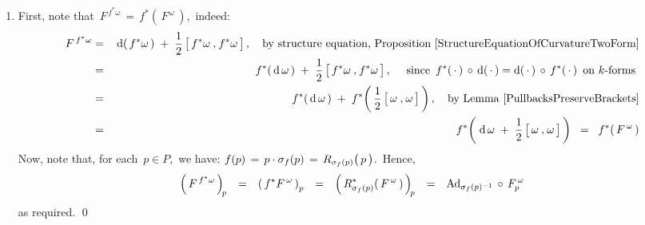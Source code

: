 \begin{enumerate}
\begin{eqnarray*}
	\end{eqnarray*}
	where the last two equalities follow from the hypothesis that \,$\omega$\,
	is a connection $1$-form, as well as from the following commutative diagram:
	\begin{center}
	\end{center}
	We may now conclude that
	\begin{equation*}
	f^{*}\omega
	\;\; = \;\;
		\Ad_{\sigma_{f}^{-1}} \,\circ\, \omega
		\; + \;
		\sigma_{f}^{*}(\,\mu_{G}\,)\,,
	\end{equation*}
	which completes the proof of (iii) as well as that of the present Proposition.
\item
	First, note that
	\,$F^{\,f^{*}\omega} \,=\, f^{*}\!\left(\,F^{\,\omega}\,\right)$,\, indeed:
	\begin{eqnarray*}
	F^{\,f^{*}\omega}
	& = &
		\,\d(\,\overset{{\color{white}.}}{f^{*}\omega}\,)
		\; + \;
		\dfrac{1}{2}\left[\,f^{*}\omega\,\overset{{\color{white}1}}{,}\,f^{*}\omega\,\right],
		\quad
		\textnormal{by structure equation, Proposition \ref{StructureEquationOfCurvatureTwoForm}}
	\\
	& = &
		f^{*}(\,\d\,\omega\,)
		\; + \;
		\dfrac{1}{2}\left[\,f^{*}\omega\,\overset{{\color{white}1}}{,}\,f^{*}\omega\,\right],
		\quad
		\textnormal{
			since \,$f^{*}(\,\cdot\,) \,\circ\, \d(\,\cdot\,) = \d(\,\cdot\,) \,\circ\, f^{*}(\,\cdot\,)$\, on $k$-forms %
			}
	\\
	& = &
		f^{*}(\,\d\,\omega\,)
		\; + \;
		f^{*}\!\left(\,\dfrac{1}{2}\left[\,\omega\,\overset{{\color{white}1}}{,}\,\omega\,\right]\,\right),
		\quad
		\textnormal{by Lemma \ref{PullbacksPreserveBrackets}}
	\\
	& = &
		f^{*}\!\left(\;
			\d\,\omega
			\;+\;
			\dfrac{1}{2}\left[\,\omega\,\overset{{\color{white}1}}{,}\,\omega\,\right]
			\,\right)
	\;\; = \;\;
		f^{*}(\,F^{\,\omega}\,)
	\end{eqnarray*}
	Now, note that, for each \,$p \in P$,\, we have:\;
	$f(p) \,=\, p \cdot \sigma_{f}(p) \,=\, R_{\sigma_{f}(p)}\!\left(\,\overset{{\color{white}.}}{p}\,\right)$.\,
	Hence,
	\begin{equation*}
	\left(\,F^{\,f^{*}\omega}\,\right)_{\!p}
	\;\;\, = \;\;\,
		\left(\,f^{*}F^{\,\omega}\,\right)_{p}
	\;\;\, = \;\;\,
		\left(\,R^{*}_{\sigma_{f}(p)}(\,F^{\,\omega}\,)\,\right)_{\!p}
	\;\;\, = \;\;\,
		\textnormal{Ad}_{\sigma_{f}(p)^{-1}} \,\circ\, F^{\,\omega}_{p}
	\end{equation*}
	as required.
	\qed
\end{enumerate}

